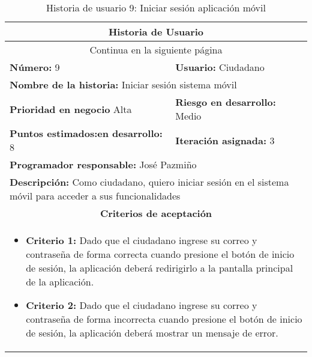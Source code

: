 \begin{longtable}{|p{6.7cm}|p{6.7cm}|}
    \caption{Historia de usuario 9: Iniciar sesión aplicación móvil} \label{tab:historia-9}
    \\
    \hline
    \multicolumn{2}{|c|}{\textbf{Historia de Usuario}}                                                                                               \\
    \hline

    \endfirsthead

    \hline
    \endhead

    \hline
    \multicolumn{2}{|c|}{{Continua en la siguiente página}}                                                                                          \\
    \hline
    \endfoot

    \hline
    \endlastfoot

    \textbf{Número:} 9                                  & \textbf{Usuario:} Ciudadano                                                                \\
    \hline
    \multicolumn{2}{|l|}{\textbf{Nombre de la historia:} Iniciar sesión sistema móvil}                                                               \\
    \hline
    \textbf{Prioridad en negocio}  Alta                 & \textbf{Riesgo en desarrollo:} Medio                                                       \\
    \hline
    \textbf{\textbf{Puntos estimados:}en desarrollo:} 8 & \textbf{Iteración asignada:} 3                                                             \\
    \hline
    \multicolumn{2}{|l|}{\textbf{Programador responsable:} José Pazmiño }                                                                            \\
    \hline
    \multicolumn{2}{|p{13.4cm}|}{\textbf{Descripción:} Como ciudadano, quiero iniciar sesión en el sistema móvil para acceder a sus funcionalidades} \\
    \hline
    \multicolumn{2}{|c|}{\textbf{Criterios de aceptación}}                                                                                           \\
    \hline
    \multicolumn{2}{|p{13.4cm}|}{
    \begin{itemize}[label={},leftmargin=*, nosep]
        \item \textbf{Criterio 1:} Dado que el ciudadano ingrese su correo y contraseña de forma correcta cuando presione el botón de inicio de sesión, la aplicación deberá redirigirlo a la pantalla principal de la aplicación.
        \item \textbf{Criterio 2:} Dado que el ciudadano ingrese su correo y contraseña de forma incorrecta cuando presione el botón de inicio de sesión, la aplicación deberá mostrar un mensaje de error.
    \end{itemize}
    }                                                                                                                                                \\
\end{longtable}


